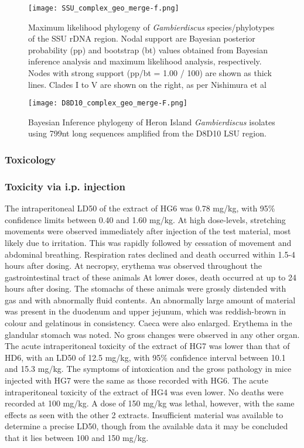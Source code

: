 \documentclass[12pt]{article}
\begin{document}
\begin{figure} 
\texttt{[image: SSU\_complex\_geo\_merge-f.png]} 
\caption{Maximum likelihood phylogeny of \textit{Gambierdiscus} species/phylotypes of the SSU rDNA region. Nodal support are Bayesian posterior probability (pp) and bootstrap (bt) values obtained from Bayesian inference analysis and maximum likelihood analysis, respectively. Nodes with strong support (pp/bt = 1.00 / 100) are shown as thick lines. Clades I to V are shown on the right, as per Nishimura et al \cite{nishimura2013genetic}}
\label{fig:HGSSU} 
\end{figure} 
\FloatBarrier 

\begin{figure} 
\texttt{[image: D8D10\_complex\_geo\_merge-F.png]} 
\caption{Bayesian Inference phylogeny of Heron Island \textit{Gambierdiscus} isolates using 799nt long sequences amplified from the D8D10 LSU region.} 
\label{fig:HGD8D10}
\end{figure} 
\FloatBarrier 


\subsubsection{Toxicology}

\subsubsection{Toxicity via i.p. injection}
The intraperitoneal LD50 of the extract of HG6 was 0.78 mg/kg, with 95\% confidence limits between 0.40 and 1.60 mg/kg. At high dose-levels, stretching movements were observed immediately after injection of the test material, most likely due to irritation. This was rapidly followed by cessation of movement and abdominal breathing. Respiration rates declined and death occurred within 1.5-4 hours after dosing. At necropsy, erythema was observed throughout the gastrointestinal tract of these animals At lower doses, death occurred at up to 24 hours after dosing. The stomachs of these animals were grossly distended with gas and with abnormally fluid contents. An abnormally large amount of material was present in the duodenum and upper jejunum, which was reddish-brown in colour and gelatinous in consistency. Caeca were also enlarged. Erythema in the glandular stomach was noted. No gross changes were observed in any other organ. 
The acute intraperitoneal toxicity of the extract of HG7 was lower than that of HD6, with an LD50 of 12.5 mg/kg, with 95\% confidence interval between 10.1 and 15.3 mg/kg. The symptoms of intoxication and the gross pathology in mice injected with HG7 were the same as those recorded with HG6. 
The acute intraperitoneal toxicity of the extract of HG4 was even lower. No deaths were recorded at 100 mg/kg. A dose of 150 mg/kg was lethal, however, with the same effects as seen with the other 2 extracts. Insufficient material was available to determine a precise LD50, though from the available data it may be concluded that it lies between 100 and 150 mg/kg.
\end{document}
